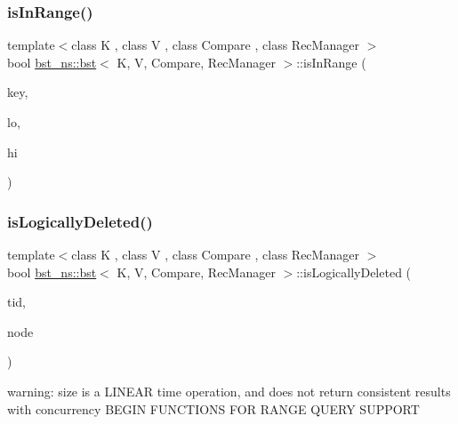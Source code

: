 \subsubsection{\texorpdfstring{is\+In\+Range()}{isInRange()}}
{\footnotesize\ttfamily template$<$class K , class V , class Compare , class Rec\+Manager $>$ \\
bool \hyperlink{classbst__ns_1_1bst}{bst\+\_\+ns\+::bst}$<$ K, V, Compare, Rec\+Manager $>$\+::is\+In\+Range (\begin{DoxyParamCaption}\item[{const K \&}]{key,  }\item[{const K \&}]{lo,  }\item[{const K \&}]{hi }\end{DoxyParamCaption})\hspace{0.3cm}{\ttfamily [inline]}}

\mbox{\label{classbst__ns_1_1bst_a6e04d71942c2db3ce039a65ac020f8af}} 
\subsubsection{\texorpdfstring{is\+Logically\+Deleted()}{isLogicallyDeleted()}}
{\footnotesize\ttfamily template$<$class K , class V , class Compare , class Rec\+Manager $>$ \\
bool \hyperlink{classbst__ns_1_1bst}{bst\+\_\+ns\+::bst}$<$ K, V, Compare, Rec\+Manager $>$\+::is\+Logically\+Deleted (\begin{DoxyParamCaption}\item[{const int}]{tid,  }\item[{\hyperlink{classbst__ns_1_1Node}{Node}$<$ K, V $>$ $\ast$}]{node }\end{DoxyParamCaption})\hspace{0.3cm}{\ttfamily [inline]}}

warning\+: size is a L\+I\+N\+E\+AR time operation, and does not return consistent results with concurrency B\+E\+G\+IN F\+U\+N\+C\+T\+I\+O\+NS F\+OR R\+A\+N\+GE Q\+U\+E\+RY S\+U\+P\+P\+O\+RT \mbox{\label{classbst__ns_1_1bst_aac59710c399b54c5a23cc2ae38688bb4}} 
